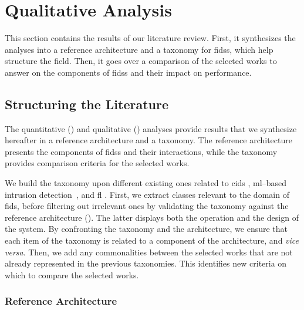 \section{Qualitative Analysis\label{sec:sota.quali}}

This section contains the results of our literature review.
First, it synthesizes the analyses into a reference architecture and a taxonomy for \glspl{fids}, which help structure the field.
Then, it goes over a comparison of the selected works to answer  on the components of \glspl{fids} and their impact on performance.


\subsection{Structuring the Literature\label{sec:sota.quali.structure}}

The quantitative () and qualitative () analyses provide results that we synthesize hereafter in a reference architecture and a taxonomy.
The reference architecture presents the components of \glspl{fids} and their interactions, while the taxonomy provides comparison criteria for the selected works.

We build the taxonomy upon different existing ones related to \gls{cids}
\cite{vasilomanolakis_TaxonomySurveyCollaborative_2015,zhou_surveycoordinatedattacks_2010}, \gls{ml}--based intrusion detection~\cite{dacosta_InternetThingssurvey_2019}, and
\gls{fl} \cite{aledhari_FederatedLearningSurvey_2020,lyu_ThreatsFederatedLearning_2020,mothukuri_surveysecurityprivacy_2021}.
First, we extract classes relevant to the domain
of \gls{fids}, before filtering out irrelevant ones by validating the taxonomy against the reference architecture ().
The latter displays both the operation and
the design of the system.
By confronting the taxonomy and the architecture, we ensure that each item
of the taxonomy is related to a component of the architecture, and \emph{vice versa}.
Then, we add any commonalities between the selected works that are not already represented in the previous taxonomies.
This identifies new criteria on which to compare the selected works.


\subsubsection{Reference Architecture\label{sec:sota.discuss.synthesis.archi}}

